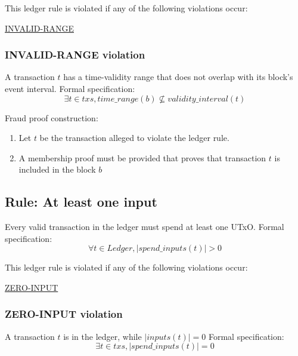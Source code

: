 \documentclass[../midgard.tex]{subfiles}
\begin{document}
This ledger rule is violated if any of the following violations occur:
\begin{itemize-multi}
  \item \hyperref[violation:INVALID-RANGE]{INVALID-RANGE}
\end{itemize-multi}

\subsubsection{INVALID-RANGE violation}
\label{violation:INVALID-RANGE}
A transaction $t$ has a time-validity range that does not overlap with its block's event interval. 
Formal specification:
\todo
\begin{equation*}
    \exists t \in txs, time\_range(b) \nsubseteq validity\_interval(t)
\end{equation*}

Fraud proof construction:
\begin{enumerate}
  \item Let $t$ be the transaction alleged to violate the ledger rule. 
  \item A membership proof must be provided that proves that transaction $t$ is included in the block $b$
\end{enumerate}

\subsection{Rule: At least one input}
\label{rule:at-least-one-input}
Every valid transaction in the ledger must spend at least one UTxO.
Formal specification:
\begin{equation*}
    \forall t \in Ledger, |spend\_inputs(t)| > 0
\end{equation*}

This ledger rule is violated if any of the following violations occur:
\begin{itemize-multi}
  \item \hyperref[violation:ZERO-INPUT]{ZERO-INPUT}
\end{itemize-multi}

\subsubsection{ZERO-INPUT violation}
\label{violation:ZERO-INPUT}
A transaction $t$ is in the ledger, while $|inputs(t)| = 0$
Formal specification:
\begin{equation*}
    \exists t \in txs, |spend\_inputs(t)| = 0
\end{equation*}
\end{document}
